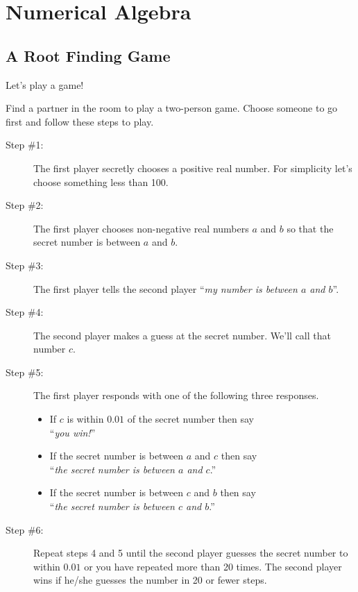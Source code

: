\chapter{Numerical Algebra}\label{ch:numerical_algebra}

\section{A Root Finding Game}
Let's play a game!
\begin{problem}\label{prob:bisection_game}
    Find a partner in the room to play a two-person game.  Choose someone to go first and
    follow these steps to play.
    \begin{description}
        \item[Step \#1:] The first player secretly chooses a positive real number. For
            simplicity let's choose something less than 100.
        \item[Step \#2:] The first player chooses non-negative real numbers $a$ and $b$ so that the
            secret number is between $a$ and $b$.  
        \item[Step \#3:] The first player tells the second player ``{\it my number is between $a$
            and $b$}''.
        \item[Step \#4:] The second player makes a guess at the secret number.  We'll call
            that number $c$.
        \item[Step \#5:] The first player responds with one of the following three
            responses.
            \begin{itemize}
                \item If $c$ is within $0.01$ of the secret number then say\\ ``{\it you win!}''
                \item If the secret number is between $a$ and $c$ then say\\ ``{\it the secret
                number is between $a$ and $c$}.''
                \item If the secret number is between $c$ and $b$ then say\\ ``{\it the secret
                number is between $c$ and $b$}.''
            \end{itemize}
        \item[Step \#6:] Repeat steps 4 and 5 until the second player guesses the secret
            number to within $0.01$ or you have repeated more than 20 times. The second
            player wins if he/she guesses the number in 20 or fewer steps.
    \end{description}
\end{problem}

